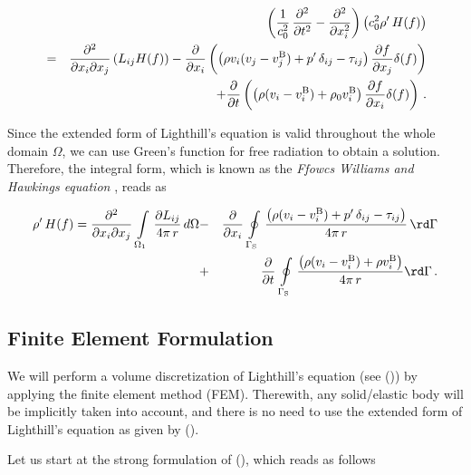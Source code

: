\documentclass[a4paper,10pt]{article}
\begin{document}
\begin{eqnarray}
\label{eq:eLend}
&&\left( \frac{1}{c_0^2}\, \frac{\partial^2}{\partial t^2} - \frac{\partial^2
}{\partial x_i^2} \right)
\left( c_0^2 \rho'\, H(f) \right) \nonumber \\
&=&
\frac{\partial^2}{\partial x_i \partial x_j} \left( L_{ij} H(f)
\right)  - \frac{\partial }{\partial x_i} \left( \left( \rho v_i (v_j -
    v^{\rm B}_j)   +
p'\, \delta_{ij} - \tau_{ij} \right) \frac{\partial f}{\partial
x_j} \delta(f) \right) \nonumber \\
&&+
 \frac{\partial}{\partial t} \left(  \left(\rho(v_i - v^{\rm B}_i) + \rho_0
    v^{\rm B}_i \right) \frac{\partial f}{\partial x_i} \delta(f) \right)\,.
\end{eqnarray}

\noindent
Since the  extended form of  Lighthill's equation is valid  throughout the
whole domain $\Omega$,  we can use Green's function  for free radiation to
obtain a  solution. Therefore,  the integral form,  which is known  as the
{\it  Ffowcs Williams  and Hawkings  equation} \cite{Ffowcs-Williams1969},
reads as

\begin{eqnarray}
 \rho'\, H(f) = \frac{\partial^2}{\partial x_i \partial x_j} \,
\int\limits_{\Omega_1}\, \frac{\partial L_{ij}}{4\pi\, r}\,d\Omega
&-& \frac{\partial }{\partial x_i} \, \oint\limits_{\Gamma_{\rm S}}\, 
\frac{ \left(\rho(v_i - v^{\rm B}_i) + p'\, \delta_{ij} - \tau_{ij}
  \right)}{4\pi\, r} \,\rd\Gamma \nonumber\\
&+& \frac{\partial }{\partial t} \, \oint\limits_{\Gamma_{\rm S}}\,
\frac{\left(\rho(v_i - v^{\rm B}_i) + \rho
    v^{\rm B}_i \right)}{4\pi \, r} \rd\Gamma\,.
\end{eqnarray}

\newpage
\subsection{Finite Element Formulation}
\label{sec:fe}

We  will perform  a  volume discretization  of  Lighthill's equation  (see
()) by  applying the finite  element method (FEM).  Therewith, any
solid/elastic body will be implicitly  taken into account, and there is no
need  to  use  the extended  form  of  Lighthill's  equation as  given  by
().

Let  us start  at the  strong formulation  of (),  which  reads as
follows
\end{document}
